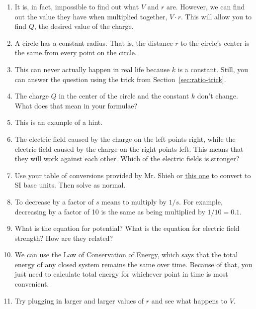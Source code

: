 \documentclass[12pt,paper=letter]{scrartcl}
\begin{document}
    \begin{enumerate}[leftmargin=0pt, itemsep=1.4em]

        \item \label{hint:voltage_challenge_1} It is, in fact, impossible to find out what $V$ and $r$ are.
        However, we can find out the value they have when multiplied together, $V\cdot r$.
        This will allow you to find $Q$, the desired value of the charge.
        \item \label{hint:circle1} A circle has a constant radius.
        That is, the distance $r$ to the circle's center is the same from every point on the circle.
        \item \label{hint:k_changes} This can never actually happen in real life because $k$ is a constant.
        Still, you can answer the question using the trick from Section~\ref{sec:ratio-trick}.
        \item \label{hint:circle2} The charge $Q$ in the center of the circle and the constant $k$ don't change.
        What does that mean in your formulae?
        \item \label{hint:ex} This is an example of a hint.
        \item \label{hint:number_line} The electric field caused by the charge on the left points right, while the electric field caused by the charge on the right points left.
        This means that they will work against each other.
        Which of the electric fields is stronger?
        \item \label{hint:table_of_conversions} Use your table of conversions provided by Mr. Shieh or \href{https://physics.nist.gov/cuu/Units/prefixes.html}{this one} to convert to SI base units.
        Then solve as normal.
        \item \label{hint:decrease_by_a_factor} To decrease by a factor of $s$ means to multiply by $1/s$.
        For example, decreasing by a factor of 10 is the same as being multiplied by $1/10=0.1$.
        \item \label{hint:field_challenge_1} What is the equation for potential?
        What is the equation for electric field strength?
        How are they related?
        \item \label{hint:conservation_of_energy} We can use the Law of Conservation of Energy,
        which says that the total energy of any closed system remains the same over time.
        Because of that, you just need to calculate total energy for whichever point in time is most convenient.
        \item \label{hint:approximate_limit} Try plugging in larger and larger values of $r$ and see what happens to $V$.

\end{enumerate}
\end{document}
